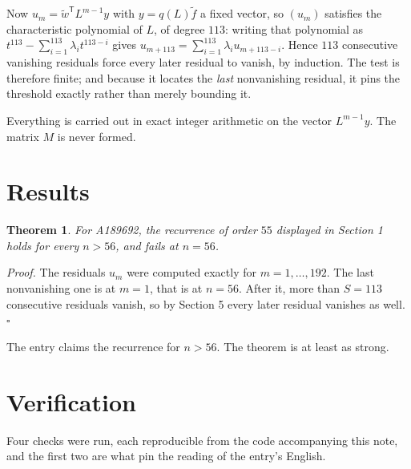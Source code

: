 \documentclass[11pt]{article}
\newtheorem{theorem}{Theorem}
\theoremstyle{definition}
\begin{document}
Now $u_m = \tilde w^{\mathsf T} L^{m-1} y$ with $y = q(L)\tilde f$ a fixed vector, so $(u_m)$ satisfies the characteristic polynomial of $L$, of degree $113$: writing that polynomial as $t^{113} - \sum_{i=1}^{113} \lambda_i t^{113-i}$ gives $u_{m+113} = \sum_{i=1}^{113} \lambda_i u_{m+113-i}$. Hence $113$ consecutive vanishing residuals force every later residual to vanish, by induction. The test is therefore finite; and because it locates the {\itshape last} nonvanishing residual, it pins the threshold exactly rather than merely bounding it.

Everything is carried out in exact integer arithmetic on the vector $L^{m-1}y$. The matrix $M$ is never formed.

\section{Results}

\begin{theorem} For A189692, the recurrence of order $55$ displayed in Section 1 holds for every $n > 56$, and fails at $n = 56$.\end{theorem}

{\itshape Proof.} The residuals $u_m$ were computed exactly for $m = 1,\dots,192$. The last nonvanishing one is at $m = 1$, that is at $n = 56$. After it, more than $S = 113$ consecutive residuals vanish, so by Section 5 every later residual vanishes as well. $\square$

The entry claims the recurrence for $n > 56$. The theorem is at least as strong.

\section{Verification}

Four checks were run, each reproducible from the code accompanying this note, and the first two are what pin the reading of the entry's English.
\end{document}
